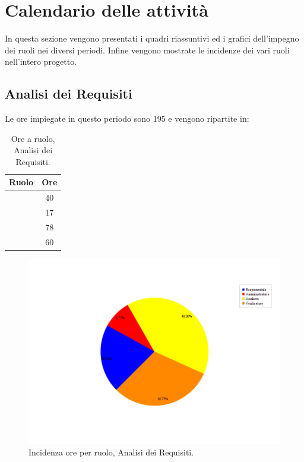 \section{Calendario delle attività}
In questa sezione vengono presentati i quadri riassuntivi ed i grafici dell'impegno dei ruoli nei diversi periodi. Infine vengono mostrate le incidenze dei vari ruoli nell'intero progetto.

\subsection{Analisi dei Requisiti}
Le ore impiegate in questo periodo sono 195 e vengono ripartite in:
\begin{table}[H]
	\begin{center}
		\begin{tabular}{|c|c|}
			\hline
			\textbf{Ruolo}	& \textbf{Ore} \\
			\hline
			\Res	&	40	\\
			\hline
			\Amm	&	17	\\
			\hline
			\Ana	&	78	\\
			\hline
			\Ver	&	60	\\
			\hline
		\end{tabular}
	\end{center}
	\caption{Ore a ruolo, Analisi dei Requisiti.}
\end{table}

\begin{figure}[H]
	\centering
	\includegraphics[scale=0.5]{immagini/Grafi/OreRuoloRR}
	\caption{Incidenza ore per ruolo, Analisi dei Requisiti.}
\end{figure}

